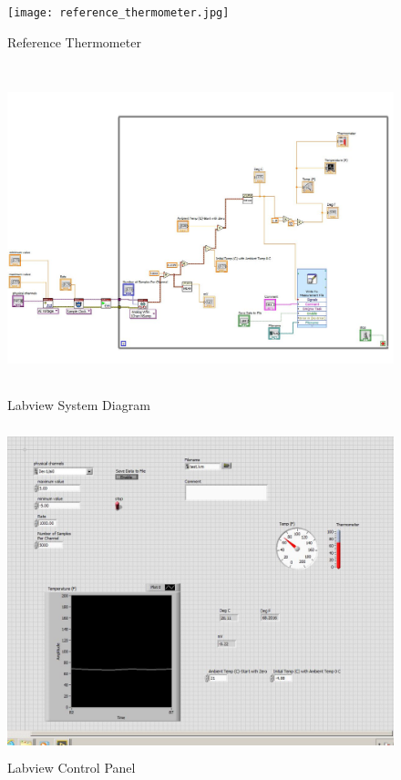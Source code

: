 \documentclass[12pt]{article}
\begin{document}
\bigskip

\begin{figure}[h!] %
   \centering
   \texttt{[image: reference\_thermometer.jpg]} 
   \caption{Reference Thermometer}
   \label{fig:example}
\end{figure}

\newpage

\begin{figure}[h!] %
   \centering
   \includegraphics[width=\linewidth, height = 3.75in]{labview_system.jpg} 
   \caption{Labview System Diagram}
   \label{fig:example}
\end{figure}


\begin{figure}[h!] %
   \centering
   \includegraphics[width=\linewidth, height = 3.75in]{labview_control_panel.jpg} 
   \caption{Labview Control Panel}
   \label{fig:example}
\end{figure}
\end{document}
